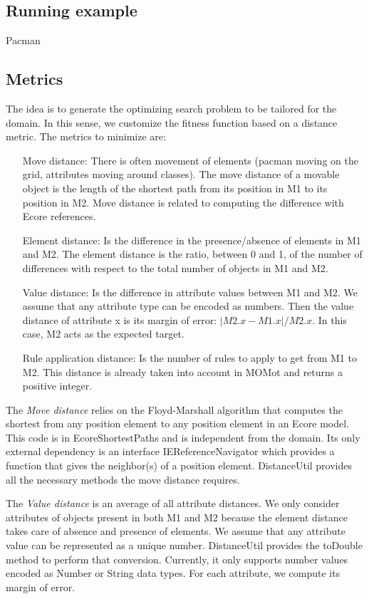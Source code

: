 \subsection{Running example}
Pacman

\subsection{Metrics}
The idea is to generate the optimizing search problem to be tailored for the domain. In this sense, we customize the fitness function based on a distance metric. The metrics to minimize are:
\begin{itemize}
	\item[Move distance:] There is often movement of elements (\eg pacman moving on the grid, attributes moving around classes). The move distance of a movable object is the length of the shortest path from its position in M1 to its position in M2. Move distance is related to computing the difference with Ecore references.
	\item[Element distance:] Is the difference in the presence/absence of elements in M1 and M2. The element distance is the ratio, between 0 and 1, of the number of differences with respect to the total number of objects in M1 and M2.
	\item[Value distance:] Is the difference in attribute values between M1 and M2. We assume that any attribute type can be encoded as numbers. Then the value distance of attribute x is its margin of error: $|M2.x - M1.x| / M2.x$. In this case, M2 acts as the expected target.
	\item[Rule application distance:] Is the number of rules to apply to get from M1 to M2. This distance is already taken into account in MOMot and returns a positive integer.
\end{itemize}

The \emph{Move distance} relies on the Floyd-Marshall algorithm that computes the shortest from any position element to any position element in an Ecore model. This code is in EcoreShortestPaths and is independent from the domain. Its only external dependency is an interface IEReferenceNavigator which provides a function that gives the neighbor(s) of a position element. DistanceUtil provides all the necessary methods the move distance requires.

The \emph{Value distance} is an average of all attribute distances. We only consider attributes of objects present in both M1 and M2 because the element distance takes care of absence and presence of elements. We assume that any attribute value can be represented as a unique number. DistanceUtil provides the toDouble method to perform that conversion. Currently, it only supports number values encoded as Number or String data types. For each attribute, we compute its margin of error.

